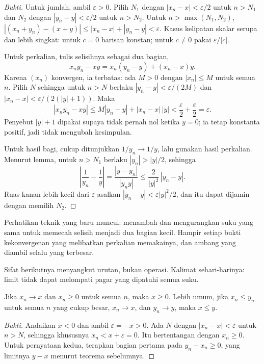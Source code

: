 \begin{proof}[Bukti]
Untuk jumlah, ambil $\varepsilon>0$. Pilih $N_1$ dengan $|x_n-x|<\varepsilon/2$
untuk $n>N_1$ dan $N_2$ dengan $|y_n-y|<\varepsilon/2$ untuk $n>N_2$. Untuk
$n>\max(N_1,N_2)$,
$|(x_n+y_n)-(x+y)| \le |x_n-x|+|y_n-y| < \varepsilon$. Kasus kelipatan skalar
serupa dan lebih singkat: untuk $c=0$ barisan konstan; untuk $c \neq 0$ pakai
$\varepsilon/|c|$.

Untuk perkalian, tulis selisihnya sebagai dua bagian,
\[
x_n y_n - xy = x_n(y_n-y) + (x_n-x)y .
\]
Karena $(x_n)$ konvergen, ia terbatas: ada $M>0$ dengan $|x_n| \le M$ untuk semua
$n$. Pilih $N$ sehingga untuk $n>N$ berlaku $|y_n-y|<\varepsilon/(2M)$ dan
$|x_n-x|<\varepsilon/(2(|y|+1))$. Maka
\[
|x_n y_n - xy| \le M|y_n-y| + |x_n-x|\,|y| < \frac{\varepsilon}{2}
+ \frac{\varepsilon}{2} = \varepsilon .
\]
Penyebut $|y|+1$ dipakai supaya tidak pernah nol ketika $y=0$; ia tetap konstanta
positif, jadi tidak mengubah kesimpulan.

Untuk hasil bagi, cukup ditunjukkan $1/y_n \to 1/y$, lalu gunakan hasil perkalian.
Menurut lemma, untuk $n>N_1$ berlaku $|y_n|>|y|/2$, sehingga
\[
\left|\frac{1}{y_n}-\frac{1}{y}\right| = \frac{|y-y_n|}{|y_n y|}
\le \frac{2}{|y|^2}\,|y_n-y| .
\]
Ruas kanan lebih kecil dari $\varepsilon$ asalkan $|y_n-y|<\varepsilon|y|^2/2$,
dan itu dapat dijamin dengan memilih $N_2$.
\end{proof}

Perhatikan teknik yang baru muncul: menambah dan mengurangkan suku yang sama untuk
memecah selisih menjadi dua bagian kecil. Hampir setiap bukti kekonvergenan yang
melibatkan perkalian memakainya, dan ambang yang diambil selalu yang terbesar.

Sifat berikutnya menyangkut urutan, bukan operasi. Kalimat sehari-harinya: limit
tidak dapat melompati pagar yang dipatuhi semua suku.

\begin{teorema}
Jika $x_n \to x$ dan $x_n \ge 0$ untuk semua $n$, maka $x \ge 0$. Lebih umum,
jika $x_n \le y_n$ untuk semua $n$ yang cukup besar, $x_n \to x$, dan $y_n \to y$,
maka $x \le y$.
\end{teorema}

\begin{proof}[Bukti]
Andaikan $x<0$ dan ambil $\varepsilon=-x>0$. Ada $N$ dengan $|x_n-x|<\varepsilon$
untuk $n>N$, sehingga khususnya $x_n < x+\varepsilon = 0$. Itu bertentangan dengan
$x_n \ge 0$. Untuk pernyataan kedua, terapkan bagian pertama pada $y_n-x_n \ge 0$,
yang limitnya $y-x$ menurut teorema sebelumnya.
\end{proof}

